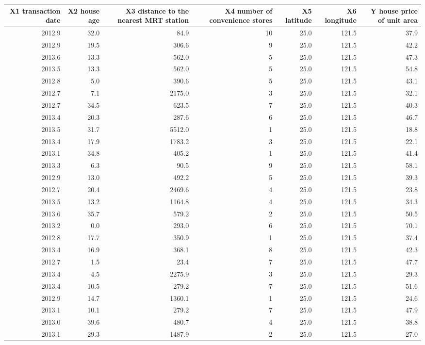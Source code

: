 \begin{tabular}{rrrrrrr}
\toprule
X1 transaction date & X2 house age & X3 distance to the nearest MRT station & X4 number of convenience stores & X5 latitude & X6 longitude & Y house price of unit area \\
\midrule
2012.9 & 32.0 & 84.9 & 10 & 25.0 & 121.5 & 37.9 \\
2012.9 & 19.5 & 306.6 & 9 & 25.0 & 121.5 & 42.2 \\
2013.6 & 13.3 & 562.0 & 5 & 25.0 & 121.5 & 47.3 \\
2013.5 & 13.3 & 562.0 & 5 & 25.0 & 121.5 & 54.8 \\
2012.8 & 5.0 & 390.6 & 5 & 25.0 & 121.5 & 43.1 \\
2012.7 & 7.1 & 2175.0 & 3 & 25.0 & 121.5 & 32.1 \\
2012.7 & 34.5 & 623.5 & 7 & 25.0 & 121.5 & 40.3 \\
2013.4 & 20.3 & 287.6 & 6 & 25.0 & 121.5 & 46.7 \\
2013.5 & 31.7 & 5512.0 & 1 & 25.0 & 121.5 & 18.8 \\
2013.4 & 17.9 & 1783.2 & 3 & 25.0 & 121.5 & 22.1 \\
2013.1 & 34.8 & 405.2 & 1 & 25.0 & 121.5 & 41.4 \\
2013.3 & 6.3 & 90.5 & 9 & 25.0 & 121.5 & 58.1 \\
2012.9 & 13.0 & 492.2 & 5 & 25.0 & 121.5 & 39.3 \\
2012.7 & 20.4 & 2469.6 & 4 & 25.0 & 121.5 & 23.8 \\
2013.5 & 13.2 & 1164.8 & 4 & 25.0 & 121.5 & 34.3 \\
2013.6 & 35.7 & 579.2 & 2 & 25.0 & 121.5 & 50.5 \\
2013.2 & 0.0 & 293.0 & 6 & 25.0 & 121.5 & 70.1 \\
2012.8 & 17.7 & 350.9 & 1 & 25.0 & 121.5 & 37.4 \\
2013.4 & 16.9 & 368.1 & 8 & 25.0 & 121.5 & 42.3 \\
2012.7 & 1.5 & 23.4 & 7 & 25.0 & 121.5 & 47.7 \\
2013.4 & 4.5 & 2275.9 & 3 & 25.0 & 121.5 & 29.3 \\
2013.4 & 10.5 & 279.2 & 7 & 25.0 & 121.5 & 51.6 \\
2012.9 & 14.7 & 1360.1 & 1 & 25.0 & 121.5 & 24.6 \\
2013.1 & 10.1 & 279.2 & 7 & 25.0 & 121.5 & 47.9 \\
2013.0 & 39.6 & 480.7 & 4 & 25.0 & 121.5 & 38.8 \\
2013.1 & 29.3 & 1487.9 & 2 & 25.0 & 121.5 & 27.0 \\

\end{tabular}
